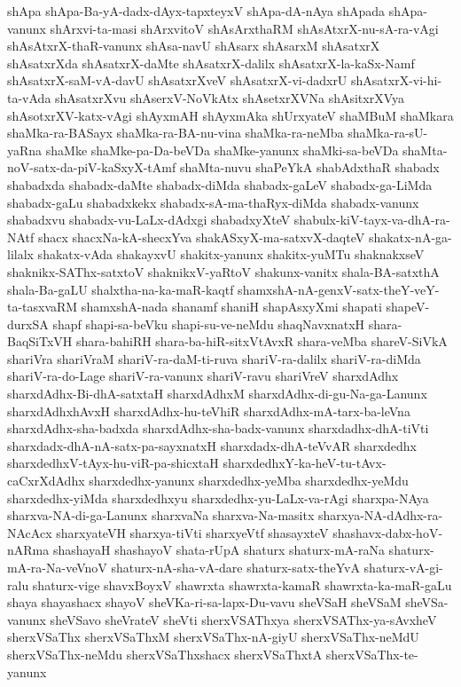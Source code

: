 {shApa
shApa-Ba-yA-dadx-dAyx-tapxteyxV
shApa-dA-nAya
shApada
shApa-vanunx
shArxvi-ta-masi
shArxvitoV
shAsArxthaRM
shAsAtxrX-nu-sA-ra-vAgi
shAsAtxrX-thaR-vanunx
shAsa-navU
shAsarx
shAsarxM
shAsatxrX
shAsatxrXda
shAsatxrX-daMte
shAsatxrX-dalilx
shAsatxrX-la-kaSx-Namf
shAsatxrX-saM-vA-davU
shAsatxrXveV
shAsatxrX-vi-dadxrU
shAsatxrX-vi-hi-ta-vAda
shAsatxrXvu
shAserxV-NoVkAtx
shAsetxrXVNa
shAsitxrXVya
shAsotxrXV-katx-vAgi
shAyxmAH
shAyxmAka
shUrxyateV
shaMBuM
shaMkara
shaMka-ra-BASayx
shaMka-ra-BA-nu-vina
shaMka-ra-neMba
shaMka-ra-sU-yaRna
shaMke
shaMke-pa-Da-beVDa
shaMke-yanunx
shaMki-sa-beVDa
shaMta-noV-satx-da-piV-kaSxyX-tAmf
shaMta-nuvu
shaPeYkA
shabAdxthaR
shabadx
shabadxda
shabadx-daMte
shabadx-diMda
shabadx-gaLeV
shabadx-ga-LiMda
shabadx-gaLu
shabadxkekx
shabadx-sA-ma-thaRyx-diMda
shabadx-vanunx
shabadxvu
shabadx-vu-LaLx-dAdxgi
shabadxyXteV
shabulx-kiV-tayx-va-dhA-ra-NAtf
shacx
shacxNa-kA-shecxYva
shakASxyX-ma-satxvX-daqteV
shakatx-nA-ga-lilalx
shakatx-vAda
shakayxvU
shakitx-yanunx
shakitx-yuMTu
shaknakxseV
shaknikx-SAThx-satxtoV
shaknikxV-yaRtoV
shakunx-vanitx
shala-BA-satxthA
shala-Ba-gaLU
shalxtha-na-ka-maR-kaqtf
shamxshA-nA-genxV-satx-theY-veY-ta-tasxvaRM
shamxshA-nada
shanamf
shaniH
shapAsxyXmi
shapati
shapeV-durxSA
shapf
shapi-sa-beVku
shapi-su-ve-neMdu
shaqNavxnatxH
shara-BaqSiTxVH
shara-bahiRH
shara-ba-hiR-sitxVtAvxR
shara-veMba
shareV-SiVkA
shariVra
shariVraM
shariV-ra-daM-ti-ruva
shariV-ra-dalilx
shariV-ra-diMda
shariV-ra-do-Lage
shariV-ra-vanunx
shariV-ravu
shariVreV
sharxdAdhx
sharxdAdhx-Bi-dhA-satxtaH
sharxdAdhxM
sharxdAdhx-di-gu-Na-ga-Lanunx
sharxdAdhxhAvxH
sharxdAdhx-hu-teVhiR
sharxdAdhx-mA-tarx-ba-leVna
sharxdAdhx-sha-badxda
sharxdAdhx-sha-badx-vanunx
sharxdadhx-dhA-tiVti
sharxdadx-dhA-nA-satx-pa-sayxnatxH
sharxdadx-dhA-teVvAR
sharxdedhx
sharxdedhxV-tAyx-hu-viR-pa-shicxtaH
sharxdedhxY-ka-heV-tu-tAvx-caCxrXdAdhx
sharxdedhx-yanunx
sharxdedhx-yeMba
sharxdedhx-yeMdu
sharxdedhx-yiMda
sharxdedhxyu
sharxdedhx-yu-LaLx-va-rAgi
sharxpa-NAya
sharxva-NA-di-ga-Lanunx
sharxvaNa
sharxva-Na-masitx
sharxya-NA-dAdhx-ra-NAcAcx
sharxyateVH
sharxya-tiVti
sharxyeVtf
shasayxteV
shashavx-dabx-hoV-nARma
shashayaH
shashayoV
shata-rUpA
shaturx
shaturx-mA-raNa
shaturx-mA-ra-Na-veVnoV
shaturx-nA-sha-vA-dare
shaturx-satx-theYvA
shaturx-vA-gi-ralu
shaturx-vige
shavxBoyxV
shawrxta
shawrxta-kamaR
shawrxta-ka-maR-gaLu
shaya
shayashacx
shayoV
sheVKa-ri-sa-lapx-Du-vavu
sheVSaH
sheVSaM
sheVSa-vanunx
sheVSavo
sheVrateV
sheVti
sherxVSAThxya
sherxVSAThx-ya-sAvxheV
sherxVSaThx
sherxVSaThxM
sherxVSaThx-nA-giyU
sherxVSaThx-neMdU
sherxVSaThx-neMdu
sherxVSaThxshacx
sherxVSaThxtA
sherxVSaThx-te-yanunx
}
